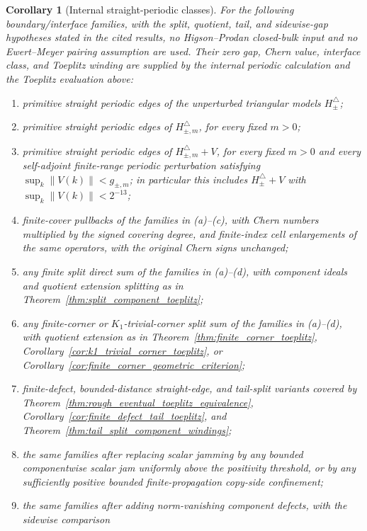 \documentclass[11pt]{article}
\numberwithin{equation}{section}
\newtheorem{corollary}[theorem]{Corollary}
\theoremstyle{definition}
\theoremstyle{remark}
\newcommand{\opnorm}[1]{\left\lVert#1\right\rVert}
\begin{document}
\begin{corollary}[Internal straight-periodic classes]\label{cor:fully_verified_straight_periodic}
For the following boundary/interface families, with the split, quotient, tail, and sidewise-gap
hypotheses stated in the cited results, no Higson--Prodan closed-bulk input and no Ewert--Meyer
pairing assumption are used. Their zero gap, Chern value, interface class, and Toeplitz winding are
supplied by the internal periodic calculation and the Toeplitz evaluation above:
\begin{enumerate}[label=(\alph*),leftmargin=2em]
\item primitive straight periodic edges of the unperturbed triangular models
  \(H^\triangle_\pm\);
\item primitive straight periodic edges of \(H^\triangle_{\pm,m}\), for every fixed \(m>0\);
\item primitive straight periodic edges of \(H^\triangle_{\pm,m}+V\), for every fixed \(m>0\) and
  every self-adjoint finite-range periodic perturbation satisfying
  \(\sup_k\opnorm{V(k)}<g_{\pm,m}\); in particular this includes
  \(H^\triangle_\pm+V\) with \(\sup_k\opnorm{V(k)}<2^{-13}\);
\item finite-cover pullbacks of the families in (a)--(c), with Chern numbers multiplied by the
  signed covering degree, and finite-index cell enlargements of the same operators, with the
  original Chern signs unchanged;
\item any finite split direct sum of the families in (a)--(d), with component ideals and quotient
  extension splitting as in Theorem~\ref{thm:split_component_toeplitz};
\item any finite-corner or \(K_1\)-trivial-corner split sum of the families in (a)--(d), with
  quotient extension as in Theorem~\ref{thm:finite_corner_toeplitz},
  Corollary~\ref{cor:k1_trivial_corner_toeplitz}, or
  Corollary~\ref{cor:finite_corner_geometric_criterion};
\item finite-defect, bounded-distance straight-edge, and tail-split variants covered by
  Theorem~\ref{thm:rough_eventual_toeplitz_equivalence},
  Corollary~\ref{cor:finite_defect_tail_toeplitz}, and
  Theorem~\ref{thm:tail_split_component_windings};
\item the same families after replacing scalar jamming by any bounded componentwise scalar jam
  uniformly above the positivity threshold, or by any sufficiently positive bounded
  finite-propagation copy-side confinement;
\item the same families after adding norm-vanishing component defects, with the sidewise comparison

\end{enumerate}
\end{corollary}
\end{document}
